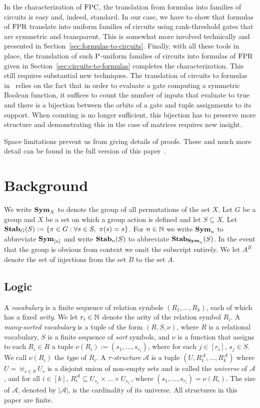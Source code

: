 \documentclass[a4paper,UKenglish]{lipics-v2018}
\begin{document}
In the characterization of $\text{\upshape FPC}$, the translation from formulas into families
of circuits is easy and, indeed, standard. In our case, we have to show that
formulas of $\text{\upshape FPR}$ translate into uniform families of circuits using
rank-threshold gates that are symmetric and transparent. This is somewhat more
involved technically and presented in Section~\ref{sec:formulas-to-circuits}.
Finally, with all these tools in place, the translation of such $\mathrm{P}$-uniform
families of circuits into formulas of $\text{\upshape FPR}$ given in
Section~\ref{sec:circuits-to-formulas} completes the characterization. This
still requires substantial new techniques. The translation of circuits to
formulas in~\cite{AndersonD17} relies on the fact that in order to evaluate a
gate computing a symmetric Boolean function, it suffices to count the number of
inputs that evaluate to true and there is a bijection between the orbits of a
gate and tuple assignments to its support. When counting is no longer
sufficient, this bijection has to preserve more structure and demonstrating this
in the case of matrices requires new insight.

Space limitations prevent us from giving details of proofs. These and much more
detail can be found in the full version of this paper~\cite{DW-arxiv}.


\section{Background}\label{sec:background}
We write $\text{\textbf{Sym}}_X$ to denote the group of all permutations of the set $X$. Let
$G$ be a group and $X$ be a set on which a group action is defined and let $S
\subseteq X$. Let $\text{\textbf{Stab}}_G(S) := \{\pi \in G : \forall s \in S , \,\, \pi(s) =
s\}$. For $n \in \mathbb{N}$ we write $\text{\textbf{Sym}}_n$ to abbreviate $\text{\textbf{Sym}}_{[n]}$ and write
$\text{\textbf{Stab}}_n(S)$ to abbreviate $\text{\textbf{Stab}}_{\text{\textbf{Sym}}_n}(S)$. In the event that the group is
obvious from context we omit the subscript entirely. We let $A^{\underline{B}}$
denote the set of injections from the set $B$ to the set $A$.

\subsection{Logic}
A \emph{vocabulary} is a finite sequence of relation symbols $(R_1, \ldots,
R_k)$, each of which has a fixed \emph{arity}. We let $r_i \in \mathbb{N}$ denote the
arity of the relation symbol $R_i$. A \emph{many-sorted vocabulary} is a tuple
of the form $(R, S, \nu)$, where $R$ is a relational vocabulary, $S$ is a finite
sequence of \emph{sort} symbols, and $\nu$ is a function that assigns to each
$R_i \in R$ a tuple $\nu(R_i) := (s_1, \ldots, s_{r_i})$, where for each $j \in
[r_i]$, $s_j \in S$. We call $\nu(R_i)$ the \emph{type} of $R_i$. A
\emph{$\tau$-structure} $\mathcal{A}$ is a tuple $(U , R^{\mathcal{A}}_1 ,
\ldots , R^{\mathcal{A}}_k)$ where $U = \uplus_{s \in S } U_{s}$ is a disjoint
union of non-empty sets and is called the \emph{universe} of $\mathcal{A}$, and
for all $i \in [k]$, $R^{\mathcal{A}}_i \subseteq U_{s_1} \times \ldots \times
U_{s_{r_i}}$, where $(s_1 , \ldots , s_{r_i}) = \nu (R_i)$. The size of
$\mathcal{A}$, denoted by $\vert \mathcal{A} \vert$, is the cardinality of its
universe. All structures in this paper are finite.
\end{document}
